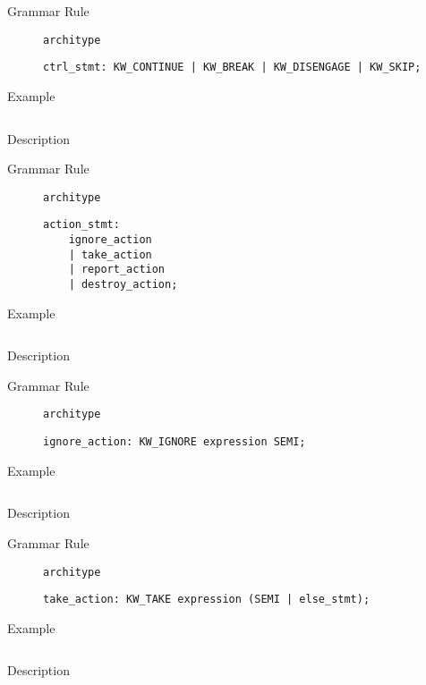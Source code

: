 \begin{description}
    \item[Grammar Rule] \texttt{architype}
          \begin{lstlisting}[style=gram]
ctrl_stmt: KW_CONTINUE | KW_BREAK | KW_DISENGAGE | KW_SKIP;
        \end{lstlisting}
    \item[Example] \texttt{}
          \begin{lstlisting}
        \end{lstlisting}

    \item[Description]
\end{description}


\begin{description}
    \item[Grammar Rule] \texttt{architype}
          \begin{lstlisting}[style=gram]
action_stmt:
    ignore_action
    | take_action
    | report_action
    | destroy_action;
        \end{lstlisting}
    \item[Example] \texttt{}
          \begin{lstlisting}
        \end{lstlisting}

    \item[Description]
\end{description}


\begin{description}
    \item[Grammar Rule] \texttt{architype}
          \begin{lstlisting}[style=gram]
ignore_action: KW_IGNORE expression SEMI;
        \end{lstlisting}
    \item[Example] \texttt{}
          \begin{lstlisting}
        \end{lstlisting}

    \item[Description]
\end{description}


\begin{description}
    \item[Grammar Rule] \texttt{architype}
          \begin{lstlisting}[style=gram]
take_action: KW_TAKE expression (SEMI | else_stmt);
        \end{lstlisting}
    \item[Example] \texttt{}
          \begin{lstlisting}
        \end{lstlisting}

    \item[Description]
\end{description}


